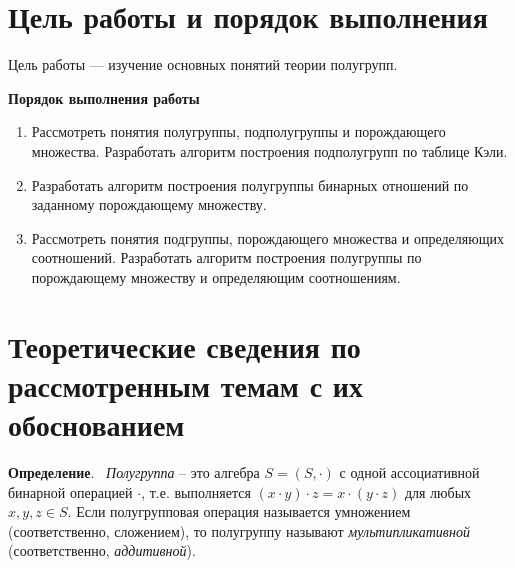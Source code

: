 \documentclass[spec, och, otchet, hidelinks]{SCWorks}
\newcommand{\tbf}[1]{\textbf{#1}}
\begin{document}


\tableofcontents






\section{Цель работы и порядок выполнения}

Цель работы — изучение основных понятий теории полугрупп. \\

\par \textbf{Порядок выполнения работы}
\begin{enumerate}
\item Рассмотреть понятия полугруппы, подполугруппы и порождающего множества.
  Разработать алгоритм построения подполугрупп по таблице Кэли.
\item Разработать алгоритм построения полугруппы бинарных отношений по заданному
  порождающему множеству.
\item Рассмотреть понятия подгруппы, порождающего множества и определяющих
  соотношений. Разработать алгоритм построения полугруппы по порождающему
  множеству и определяющим соотношениям.
\end{enumerate}
  
\newpage

\section{Теоретические сведения по рассмотренным темам с их обоснованием}

\par \tbf{Определение}. $\,$ \textit{Полугруппа} – это алгебра $S = (S, \cdot)$ с одной
ассоциативной бинарной операцией $\cdot$, т.е. выполняется $(x \cdot y) \cdot z
= x \cdot (y \cdot z) $ для любых $x, y, z \in S.$ Если полугрупповая операция называется умножением
(соответственно, сложением), то полугруппу называют \textit{мультипликативной}
(соответственно, \textit{аддитивной}).
\end{document}
